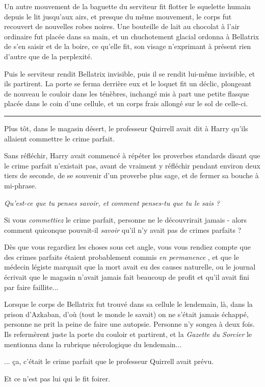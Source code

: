 Un autre mouvement de la baguette du serviteur fit flotter le squelette humain depuis le lit jusqu'aux airs, et presque du même mouvement, le corps fut recouvert de nouvelles robes noires. Une bouteille de lait au chocolat à l'air ordinaire fut placée dans sa main, et un chuchotement glacial ordonna à Bellatrix de s'en saisir et de la boire, ce qu'elle fit, son visage n'exprimant à présent rien d'autre que de la perplexité.

Puis le serviteur rendit Bellatrix invisible, puis il se rendit lui-même invisible, et ils partirent. La porte se ferma derrière eux et le loquet fit un déclic, plongeant de nouveau le couloir dans les ténèbres, inchangé mis à part une petite flasque placée dans le coin d'une cellule, et un corps frais allongé sur le sol de celle-ci.
\par\noindent\rule{\textwidth}{0.4pt}
Plus tôt, dans le magasin désert, le professeur Quirrell avait dit à Harry qu'ils allaient commettre le crime parfait.

Sans réfléchir, Harry avait commencé à répéter les proverbes standards disant que le crime parfait n'existait pas, avant de vraiment y réfléchir pendant environ deux tiers de seconde, de se souvenir d'un proverbe plus sage, et de fermer sa bouche à mi-phrase.

\emph{Qu'est-ce que tu penses savoir, et comment penses-tu que tu le sais ?} 

Si vous \emph{commettiez}  le crime parfait, personne ne le découvrirait jamais - alors comment quiconque pouvait-il \emph{savoir}  qu'il n'y avait pas de crimes parfaits ?

Dès que vous regardiez les choses sous cet angle, vous vous rendiez compte que des crimes parfaits étaient probablement commis \emph{en permanence} , et que le médecin légiste marquait que la mort avait eu des causes naturelle, ou le journal écrivait que le magasin n'avait jamais fait beaucoup de profit et qu'il avait fini par faire faillite...

Lorsque le corps de Bellatrix fut trouvé dans sa cellule le lendemain, là, dans la prison d'Azkaban, d'où (tout le monde le savait) on ne s'était jamais échappé, personne ne prit la peine de faire une autopsie. Personne n'y songea à deux fois. Ils refermèrent juste la porte du couloir et partirent, et la \emph{Gazette du Sorcier}  le mentionna dans la rubrique nécrologique du lendemain...

... ça, c'était le crime parfait que le professeur Quirrell avait prévu.

Et ce n'est pas lui qui le fit foirer.

